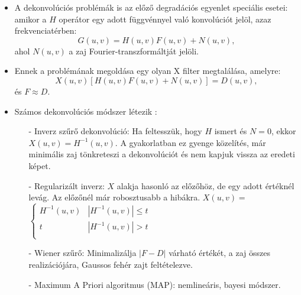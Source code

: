 \documentclass[12pt]{article}
\theoremstyle{plain}
\begin{document}
\begin{itemize}
    \item A dekonvolúciós problémák is az előző degradációs egyenlet speciális esetei: amikor a $H$ operátor egy adott függvénnyel való konvolúciót jelöl, azaz frekvenciatérben:
    $$G(u,v) = H(u,v)F(u,v) + N(u,v),$$
    ahol $N(u,v)$ a zaj Fourier-transzformáltját jelöli.
    \item Ennek a problémának megoldása egy olyan X filter megtalálása, amelyre:
    $$X(u,v)[H(u,v)F(u,v) + N(u,v)] = D(u,v) ,$$
    és $ F \approx D.$
    \item Számos dekonvolúciós módszer létezik \cite{deconv}:
    \begin{itemize}
        \item[-] Inverz szűrő dekonvolúció: Ha feltesszük, hogy $H$ ismert és $N = 0$, ekkor $X(u,v) = H^{-1}(u,v)$. A gyakorlatban ez gyenge közelítés, már minimális zaj tönkreteszi a dekonvolúciót és nem kapjuk vissza az eredeti képet.
        \item[-] Regularizált inverz: $X$ alakja hasonló az előzőhöz, de egy adott értéknél levág. Az előzőnél már robosztusabb a hibákra. $X(u,v) =$    $\left\{
        \begin{array}{ll}
          H^{-1}(u,v) & |H^{-1}(u,v)| \leq t \\
          t & |H^{-1}(u,v)| > t \\
        \end{array} \right.$
        \item[-] Wiener szűrő: Minimalizálja $|F-D|$ várható értékét, a zaj összes realizációjára, Gaussos fehér zajt feltételezve.
        \item[-] Maximum A Priori algoritmus (MAP): nemlineáris, bayesi módszer.
    \end{itemize}{}
\end{itemize}{}
\end{document}
